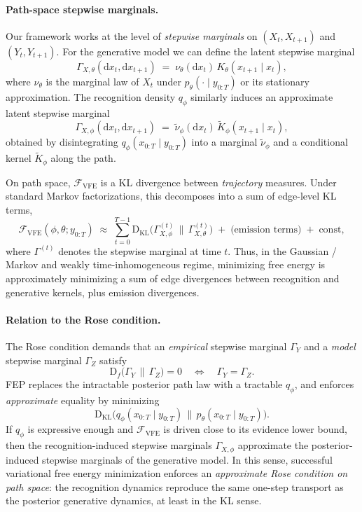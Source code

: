 \documentclass[11pt]{article}
\newcommand{\1}{\mathbf{1}}
\begin{document}
\paragraph{Path-space stepwise marginals.}
Our framework works at the level of \emph{stepwise marginals} on $(X_t,X_{t+1})$ and $(Y_t,Y_{t+1})$. For the generative model we can define the latent stepwise marginal
\[
\Gamma_{X,\theta}(\mathrm dx_t,\mathrm dx_{t+1})
\;=\;
\nu_\theta(\mathrm dx_t)\,K_\theta(x_{t+1}\mid x_t),
\]
where $\nu_\theta$ is the marginal law of $X_t$ under $p_\theta(\cdot\mid y_{0:T})$ or its stationary approximation. The recognition density $q_\phi$ similarly induces an approximate latent stepwise marginal
\[
\Gamma_{X,\phi}(\mathrm dx_t,\mathrm dx_{t+1})
\;=\;
\tilde\nu_\phi(\mathrm dx_t)\,\tilde K_\phi(x_{t+1}\mid x_t),
\]
obtained by disintegrating $q_\phi(x_{0:T}\mid y_{0:T})$ into a marginal $\tilde\nu_\phi$ and a conditional kernel $\tilde K_\phi$ along the path.

On path space, $\mathcal{F}_{\mathrm{VFE}}$ is a KL divergence between \emph{trajectory} measures. Under standard Markov factorizations, this decomposes into a sum of edge-level KL terms,
\[
\mathcal{F}_{\mathrm{VFE}}(\phi,\theta;y_{0:T})
\;\approx\;
\sum_{t=0}^{T-1}
\mathrm{D}_{\mathrm{KL}}\!\big(
\Gamma_{X,\phi}^{(t)} \,\big\|\, \Gamma_{X,\theta}^{(t)}
\big)
\;+\; \text{(emission terms)} 
\;+\; \text{const},
\]
where $\Gamma^{(t)}$ denotes the stepwise marginal at time $t$. Thus, in the Gaussian / Markov and weakly time-inhomogeneous regime, minimizing free energy is approximately minimizing a sum of edge divergences between recognition and generative kernels, plus emission divergences.

\paragraph{Relation to the Rose condition.}
The Rose condition demands that an \emph{empirical} stepwise marginal $\Gamma_Y$ and a \emph{model} stepwise marginal $\Gamma_Z$ satisfy
\[
\mathrm{D}_f\!\big(\Gamma_Y \,\big\|\, \Gamma_Z\big) = 0
\quad\Longleftrightarrow\quad
\Gamma_Y = \Gamma_Z.
\]
FEP replaces the intractable posterior path law with a tractable $q_\phi$, and enforces \emph{approximate} equality by minimizing
\[
\mathrm{D}_{\mathrm{KL}}\!\big(q_\phi(x_{0:T}\mid y_{0:T}) \,\big\|\, p_\theta(x_{0:T}\mid y_{0:T})\big).
\]
If $q_\phi$ is expressive enough and $\mathcal{F}_{\mathrm{VFE}}$ is driven close to its evidence lower bound, then the recognition-induced stepwise marginals $\Gamma_{X,\phi}$ approximate the posterior-induced stepwise marginals of the generative model. In this sense, successful variational free energy minimization enforces an \emph{approximate Rose condition on path space}: the recognition dynamics reproduce the same one-step transport as the posterior generative dynamics, at least in the KL sense.
\end{document}
